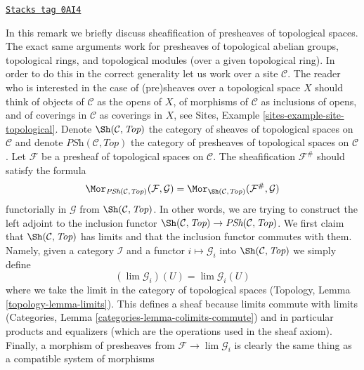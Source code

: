 \begin{remark}

\label{formal-spaces-remark-sheafification-of-presheaves-in-top}
\href{https://stacks.math.columbia.edu/tag/0AI4}{\texttt{Stacks tag 0AI4}}

\begin{reference}
\cite{Gray}
\end{reference}
In this remark we briefly discuss sheafification of presheaves
of topological spaces. The exact same arguments work for
presheaves of topological abelian groups, topological rings, and
topological modules (over a given topological ring). In order to
do this in the correct generality let us work over a site
$\mathcal{C}$. The reader who is interested in the case of (pre)sheaves
over a topological space $X$ should think of objects of $\mathcal{C}$
as the opens of $X$, of morphisms of $\mathcal{C}$ as inclusions of
opens, and of coverings in $\mathcal{C}$ as coverings in $X$, see
Sites, Example \ref{sites-example-site-topological}.
Denote $\Sh(\mathcal{C}, \textit{Top})$ the category of sheaves
of topological spaces on $\mathcal{C}$ and denote
$\textit{PSh}(\mathcal{C}, \textit{Top})$ the category of presheaves
of topological spaces on $\mathcal{C}$.
Let $\mathcal{F}$ be a presheaf of topological spaces on $\mathcal{C}$.
The sheafification $\mathcal{F}^\#$ should satisfy the formula
$$
\Mor_{\textit{PSh}(\mathcal{C}, \textit{Top})}(\mathcal{F}, \mathcal{G})
=
\Mor_{\Sh(\mathcal{C}, \textit{Top})}(\mathcal{F}^\#, \mathcal{G})
$$
functorially in $\mathcal{G}$ from $\Sh(\mathcal{C}, \textit{Top})$.
In other words, we are trying to construct the left adjoint
to the inclusion functor
$\Sh(\mathcal{C}, \textit{Top}) \to \textit{PSh}(\mathcal{C}, \textit{Top})$.
We first claim that $\Sh(\mathcal{C}, \textit{Top})$ has limits
and that the inclusion functor commutes with them.
Namely, given a category $\mathcal{I}$ and a functor
$i \mapsto \mathcal{G}_i$ into $\Sh(\mathcal{C}, \textit{Top})$
we simply define
$$
(\lim \mathcal{G}_i)(U) = \lim \mathcal{G}_i(U)
$$
where we take the limit in the category of topological spaces
(Topology, Lemma \ref{topology-lemma-limits}). This defines a sheaf
because limits commute with limits
(Categories, Lemma \ref{categories-lemma-colimits-commute})
and in particular products and equalizers (which are the
operations used in the sheaf axiom). Finally, a morphism
of presheaves from $\mathcal{F} \to \lim \mathcal{G}_i$ is
clearly the same thing as a compatible system of morphisms

\end{remark}
